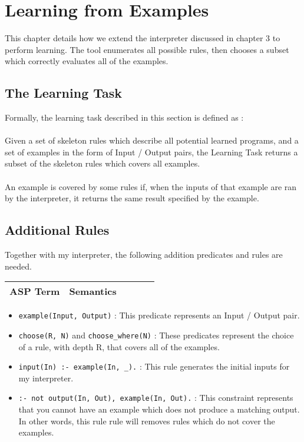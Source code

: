 \chapter{Learning from Examples}

This chapter details how we extend the interpreter discussed in chapter 3 to perform learning. The tool enumerates all possible rules, then chooses a subset which correctly evaluates all of the examples.

\section{The Learning Task}
Formally, the learning task described in this section is defined as : \\ \\
Given a set of skeleton rules which describe all potential learned programs, and a set of examples in the form of Input / Output pairs, the Learning Task returns a subset of the skeleton rules which covers all examples. \\ \\
An example is covered by some rules if, when the inputs of that example are ran by the interpreter, it returns the same result specified by the example.

\section{Additional Rules}
Together with my interpreter, the following addition predicates and rules are needed.
\begin{center}
\begin{tabular}{| c | m{0.6\linewidth} |}
\hline
\textbf{ASP Term} & \textbf{Semantics} \\
\hline
\end{tabular}
\end{center}

\begin{itemize}
\item \lstinline{example(Input, Output)} : This predicate represents an Input / Output pair.
\item \lstinline{choose(R, N)} and \lstinline{choose_where(N)} : These predicates represent the choice of a rule, with depth R, that covers all of the examples.
\item \lstinline{input(In) :- example(In, _).} : This rule generates the initial inputs for my interpreter.
\item \lstinline{:- not output(In, Out), example(In, Out).}  : This constraint represents that you cannot have an example which does not produce a matching output. In other words, this rule rule will removes rules which do not cover the examples.
\end{itemize}


